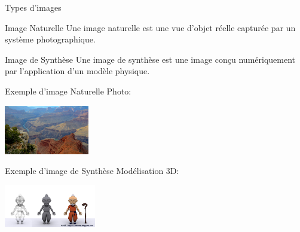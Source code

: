 \documentclass[french]{beamer}
\begin{document}
            \begin{frame}{Types d'images}
                \begin{block}{Image Naturelle}
                        Une image naturelle est une vue d'objet réelle capturée par un système photographique.
                \end{block}
                \begin{block}{Image de Synthèse}
                        Une image de synthèse est une image conçu numériquement par l'application d'un modèle physique.
                \end{block}
            \end{frame}
            \begin{frame}
                \begin{exampleblock}{Exemple d'image Naturelle}
	               Photo:\\
	               \begin{center}
	                    \includegraphics[width=3.7cm]{photo_naturelle.jpg}
	               \end{center}
            	\end{exampleblock}
            	\begin{exampleblock}{Exemple d'image de Synthèse}
                    Modélisation 3D:\\
                    \begin{center}
	                    \includegraphics[width=4cm]{Image_synthese.jpg}
	                \end{center}
            	\end{exampleblock}
            \end{frame}
            
\end{document}
